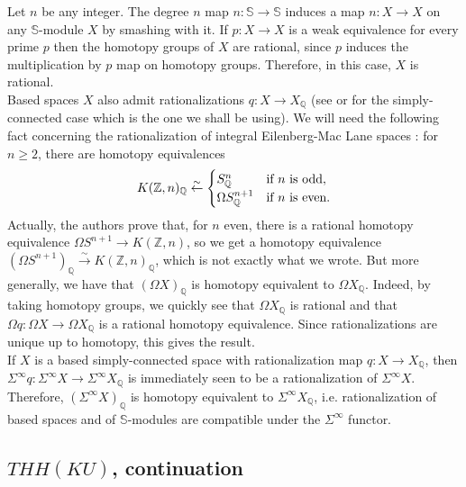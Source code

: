 \documentclass[a4paper,11pt]{amsart} %
\theoremstyle{definition} \newtheorem{defn}[equation]{Definition}
\theoremstyle{remark} \newtheorem{notation}[equation]{Notation}
\theoremstyle{plain} \newtheorem{teo}[equation]{Theorem}
\theoremstyle{plain} \newtheorem{lema}[equation]{Lemma}
\theoremstyle{plain} \newtheorem{prop}[equation]{Proposition}
\theoremstyle{plain} \newtheorem{corolario}[equation]{Corollary}
\theoremstyle{remark} \newtheorem{obs}[equation]{Remark}
\theoremstyle{remark} \newtheorem{sideobs}[equation]{Side remark}
\theoremstyle{remark} \newtheorem{ejercicio}[equation]{Exercise}
\theoremstyle{definition} \newtheorem{notn}[equation]{Notation}
\theoremstyle{remark} \newtheorem{ej}[equation]{Example}
\theoremstyle{remark} \newtheorem{contraej}[equation]{Counterexample}
\theoremstyle{plain} \newtheorem{conj}[equation]{Conjecture}
\renewcommand{\1}{\ensuremath{\mathbbm{1}}}
\newcommand{\Q}{\mathbb{Q}}
\renewcommand{\S}{\mathbb{S}}
\newcommand{\Z}{\mathbb{Z}}
\numberwithin{equation}{section}
\begin{document}
%
%
%


%
%
%
%
%
%

%
%
%
%


Let $n$ be any integer. The degree $n$ map $n:\S\to \S$ induces a map $n:X\to X$ on any $\S$-module $X$ by smashing with it. If $p:X\to X$ is a weak equivalence for every prime $p$ 
then the homotopy groups of $X$ are rational, since $p$ induces the multiplication by $p$ map on homotopy groups. %
Therefore, in this case, $X$ is rational.\\%

Based spaces $X$ also admit rationalizations $q:X\to X_\Q$ (see \cite[9.(b)]{fht-rational} or \cite[6.5]{mayponto} for the simply-connected case which is the one we shall be using). %
We will need the following fact concerning the rationalization of integral Eilenberg-Mac Lane spaces \cite[Page 202]{fht-rational}: for $n\geq 2$, there are homotopy equivalences 
\[K(\Z,n)_\Q \stackrel{\sim}{\leftarrow} \begin{cases} S^n_\Q & \textup{if } n \textup{ is odd}, \\ \Omega S^{n+1}_\Q & \textup{if } n \textup{ is even.} \end{cases}\] 
%
%
Actually, the authors prove that, for $n$ even, there is a rational homotopy equivalence $\Omega S^{n+1} \to K(\Z,n)$, so we get a homotopy equivalence $(\Omega S^{n+1})_\Q \stackrel{\sim}{\to} K(\Z,n)_\Q$, which is not exactly what we wrote. But more generally, we have that $(\Omega X)_\Q$ is homotopy equivalent to $\Omega X_\Q$. Indeed, %
%
%
%
%
%
by taking homotopy groups, we quickly see that $\Omega X_\Q$ is rational and that $\Omega q:\Omega X\to \Omega X_\Q$ is a rational homotopy equivalence. Since rationalizations are unique up to homotopy, this gives the result.\\

If $X$ is a based simply-connected space with rationalization map $q:X\to X_\Q$, then $\Sigma^\infty q:\Sigma^\infty X \to \Sigma^\infty X_\Q$ is immediately seen to be a rationalization of $\Sigma^\infty X$. %
%
Therefore, $(\Sigma^\infty X)_\Q$ is homotopy equivalent to $\Sigma^\infty X_\Q$, i.e. rationalization of based spaces and of $\S$-modules are compatible under the $\Sigma^\infty$ functor.
%


%
%
%
%


\subsection{$THH(KU)$, continuation} \label{sect-thhku2}
\end{document}
